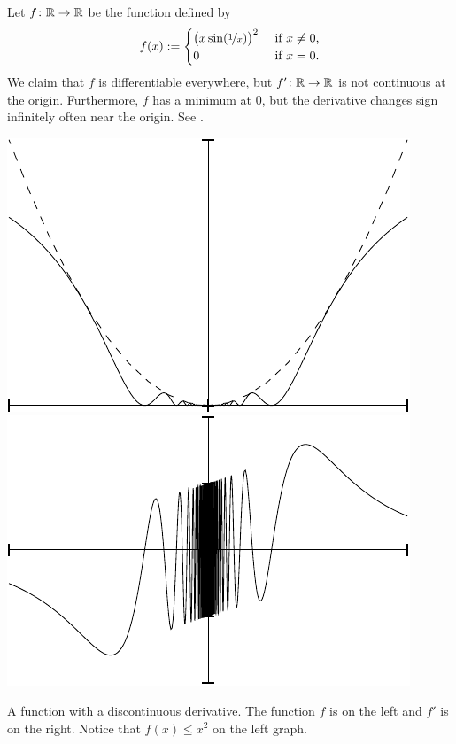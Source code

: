 \begin{example} \label{baddifffunc:example}
Let $f \colon {\mathbb{R}} \to {\mathbb{R}}$ be the function defined by
\begin{equation*}
f(x) :=
\begin{cases}
{\bigl( x \sin(\nicefrac{1}{x}) \bigr)}^2 & \text{ if $x \not= 0$,} \\
0 & \text{ if $x = 0$.}
\end{cases}
\end{equation*}
We claim that $f$ is differentiable everywhere, but
$f' \colon {\mathbb{R}} \to {\mathbb{R}}$ is not continuous at
the origin.  Furthermore, $f$ has a minimum at 0, but the derivative
changes sign infinitely often near the origin.
See .
\begin{myfigureht}
\includegraphics{figures/nonc1difffig}
\qquad
\includegraphics{figures/nonc1diffderfig}
\caption{A function with a discontinuous derivative. The function $f$ is on the left
and $f'$ is on the right.  Notice that $f(x) \leq x^2$ on the left graph.\label{fig:nonc1diff}}
\end{myfigureht}


\end{example}
